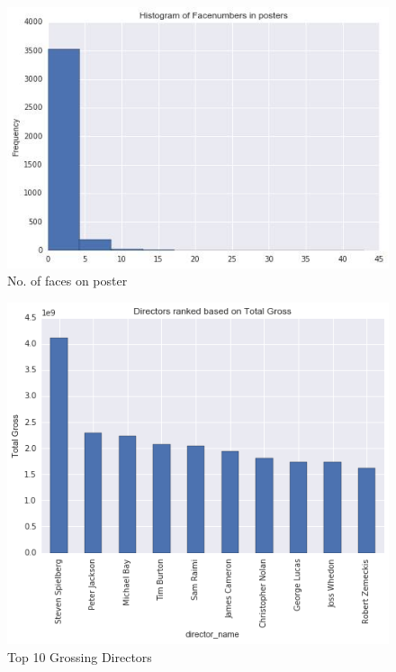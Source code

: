 \documentclass{article}%
\begin{document}
\begin{figure}
\centering
\includegraphics[width=1.0\columnwidth]{Fig/face.png}
\caption{No. of faces on poster}
\label{fig:face}
\end{figure}

\begin{figure}
\centering
\includegraphics[width=1.0\columnwidth]{Fig/DTGR.png}
\caption{Top 10 Grossing Directors}
\label{fig:DirectorsRankedontotalgross.png}
\end{figure}
\end{document}
